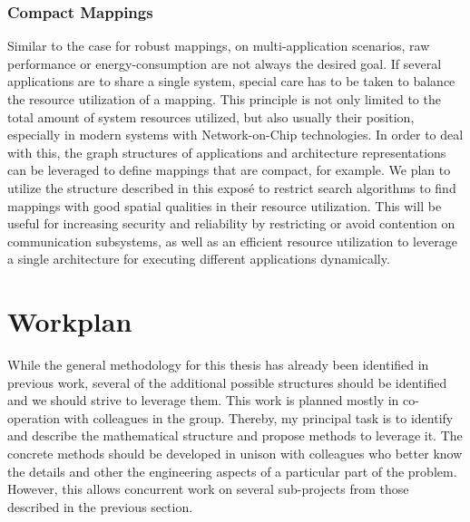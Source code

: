 \documentclass[sigplan,10pt]{acmart}
\begin{document}
\subsubsection{Compact Mappings}
Similar to the case for robust mappings, on multi-application scenarios, raw performance or energy-consumption are not always the desired goal. If several applications are to share a single system, special care has to be taken to balance the resource utilization of a mapping.
This principle is not only limited to the total amount of system resources utilized, but also usually their position, especially in modern systems with Network-on-Chip technologies.
In order to deal with this, the graph structures of applications and architecture representations can be leveraged to define mappings that are compact, for example.
We plan to utilize the structure described in this exposé to restrict search algorithms to find mappings with good spatial qualities in their resource utilization. This will be useful for increasing security and reliability by restricting or avoid contention on communication subsystems,
as well as an efficient resource utilization to leverage a single architecture for executing different applications dynamically.

\section{Workplan}
\label{sec:visit}

While the general methodology for this thesis has already been identified in previous work, several of the additional possible structures should be identified and we should strive to leverage them. This work is planned mostly in co-operation with colleagues in the group. Thereby, my principal task is to identify and describe the mathematical structure and propose methods to leverage it.
The concrete methods should be developed in unison with colleagues who better know the details and other the engineering aspects of a particular part of the problem. However, this allows concurrent work on several sub-projects from those described in the previous section.
\end{document}
